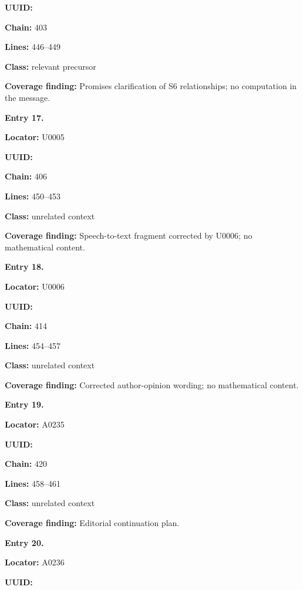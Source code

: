 \documentclass[10pt,a4paper,oneside]{report}
\begin{document}
\textbf{UUID:} \protect{}

\textbf{Chain:} 403

\textbf{Lines:} 446--449

\textbf{Class:} relevant precursor

\textbf{Coverage finding:} Promises clarification of S6 relationships;
no computation in the message.


\textbf{Entry 17.}

\textbf{Locator:} U0005

\textbf{UUID:} \protect{}

\textbf{Chain:} 406

\textbf{Lines:} 450--453

\textbf{Class:} unrelated context

\textbf{Coverage finding:} Speech-to-text fragment corrected by U0006;
no mathematical content.


\textbf{Entry 18.}

\textbf{Locator:} U0006

\textbf{UUID:} \protect{}

\textbf{Chain:} 414

\textbf{Lines:} 454--457

\textbf{Class:} unrelated context

\textbf{Coverage finding:} Corrected author-opinion wording; no
mathematical content.


\textbf{Entry 19.}

\textbf{Locator:} A0235

\textbf{UUID:} \protect{}

\textbf{Chain:} 420

\textbf{Lines:} 458--461

\textbf{Class:} unrelated context

\textbf{Coverage finding:} Editorial continuation plan.


\textbf{Entry 20.}

\textbf{Locator:} A0236

\textbf{UUID:} \protect{}
\end{document}
